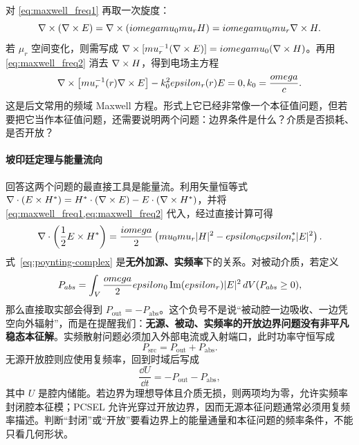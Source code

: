 对 \cref{eq:maxwell_freq1} 再取一次旋度：
\[
\nabla\times(\nabla\times E)=\nabla\times(iomegamu_0mu_r H)
=iomegamu_0mu_r\nabla\times H.
\]
若 $\mu_r$ 空间变化，则需写成 $\nabla\times[mu_r^{-1}(\nabla\times E)]=iomegamu_0(\nabla\times H)$。再用 \cref{eq:maxwell_freq2} 消去 $\nabla\times H$，得到电场主方程
\begin{equation}
\nabla\times\left[mu_r^{-1}(r)\nabla\times E\right]-k_0^2epsilon_r(r)E=0,
 k_0=\frac{omega}{c}.
\label{eq:maxwell-eigen}
\end{equation}
这是后文常用的频域 Maxwell 方程。形式上它已经非常像一个本征值问题，但若要把它当作本征值问题，还需要说明两个问题：边界条件是什么？介质是否损耗、是否开放？

\paragraph{坡印廷定理与能量流向}
回答这两个问题的最直接工具是能量流。利用矢量恒等式 $\nabla\cdot(E\times H^*) = H^*\cdot(\nabla\times E) - E\cdot(\nabla\times H^*)$，并将 \cref{eq:maxwell_freq1,eq:maxwell_freq2} 代入，经过直接计算可得
\begin{equation}
\nabla\cdot\left(\frac{1}{2}E\times H^*\right)
= \frac{iomega}{2}\left(mu_0mu_r|H|^2 - epsilon_0epsilon_r^*|E|^2\right).
\label{eq:poynting-complex}
\end{equation}
式~\eqref{eq:poynting-complex} 是\textbf{无外加源、实频率}下的关系。对被动介质，若定义
\begin{equation}
P_{abs}
=
\int_V\frac{omega}{2}epsilon_0\operatorname{Im}(epsilon_r)|E|^2\,d V
 (P_{abs}\ge 0),
\label{eq:poynting-absorption}
\end{equation}
那么直接取实部会得到 $P_{\mathrm{out}}=-P_{\mathrm{abs}}$。这个负号不是说“被动腔一边吸收、一边凭空向外辐射”，而是在提醒我们：\textbf{无源、被动、实频率的开放边界问题没有非平凡稳态本征解}。实频散射问题必须加入外部电流或入射端口，此时功率守恒写成
\begin{equation}
P_{\mathrm{src}}=P_{\mathrm{out}}+P_{\mathrm{abs}}.
\label{eq:poynting-driven-balance}
\end{equation}
无源开放腔则应使用复频率，回到时域后写成
\begin{equation}
\frac{\dd U}{\dd t}=-P_{\mathrm{out}}-P_{\mathrm{abs}},
\label{eq:poynting-qnm-decay}
\end{equation}
其中 $U$ 是腔内储能。若边界为理想导体且介质无损，则两项均为零，允许实频率封闭腔本征模；PCSEL 允许光穿过开放边界，因而无源本征问题通常必须用复频率描述。判断“封闭”或“开放”要看边界上的能量通量和本征问题的频率条件，不能只看几何形状。

